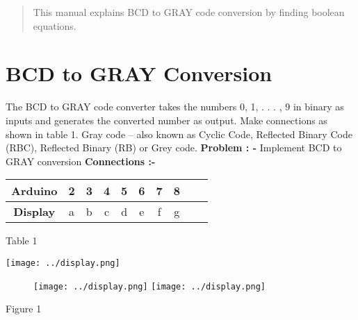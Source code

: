 \documentclass{article}
\begin{document}
\begin{multicols}{2}
\begin{center}
\author{Valmeekam Navya}
\begin{tableofcontents}
\begin{abstract}
    This manual explains BCD to GRAY code conversion by finding boolean equations.
\end{abstract}
\section{BCD to GRAY Conversion}
The BCD to GRAY code converter takes the numbers 0, 1, . . . , 9 in binary as inputs and generates the converted number as output. Make connections as shown in table 1.
Gray code – also known as Cyclic Code, Reflected Binary Code (RBC), Reflected Binary (RB) or Grey code.
\newline
\newline
\textbf{Problem : -}
Implement BCD to GRAY conversion 
\newline
\vspace{4cm}
\newline
\newline
\newline
\newline
\newline
\textbf{Connections :-}
\newline
\newline
\begin{tabular}{|c|c|c|c|c|c|c|c|c|c|}
\hline
\textbf{Arduino} & 2 & 3 & 4 & 5 & 6 & 7 & 8  \\
\hline
\textbf{Display} & {a} & {b} & {c} & {d} & {e} & {f} & {g} \\
\hline
\end{tabular}
\newline
Table 1

\texttt{[image: ../display.png]} 
\begin{figure}[hbtp]
\texttt{[image: ../display.png]}
\texttt{[image: ../display.png]}
\end{figure}
\begin{center}
Figure 1
\end{center}
\newpage

\end{tableofcontents}
\end{center}
\end{multicols}
\end{document}
